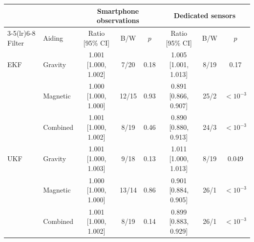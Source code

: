 \begin{tabular}{llccc@{\hspace{1.2em}}ccc}
\toprule
 & & \multicolumn{3}{c}{Smartphone observations} & \multicolumn{3}{c}{Dedicated sensors} \\
\cmidrule(lr){3-5}\cmidrule(lr){6-8}
Filter & Aiding & Ratio [95\% CI] & B/W & \(p\) & Ratio [95\% CI] & B/W & \(p\) \\
\midrule
EKF & Gravity & 1.001 [1.000, 1.002] & 7/20 & 0.18 & 1.005 [1.001, 1.013] & 8/19 & 0.17 \\
 & Magnetic & 1.000 [1.000, 1.000] & 12/15 & 0.93 & 0.891 [0.866, 0.907] & 25/2 & \(<10^{-3}\) \\
 & Combined & 1.001 [1.000, 1.002] & 8/19 & 0.46 & 0.890 [0.880, 0.913] & 24/3 & \(<10^{-3}\) \\
\midrule
UKF & Gravity & 1.001 [1.000, 1.003] & 9/18 & 0.13 & 1.011 [1.000, 1.013] & 8/19 & 0.049 \\
 & Magnetic & 1.000 [1.000, 1.000] & 13/14 & 0.86 & 0.901 [0.884, 0.905] & 26/1 & \(<10^{-3}\) \\
 & Combined & 1.001 [1.000, 1.002] & 8/19 & 0.14 & 0.899 [0.883, 0.929] & 26/1 & \(<10^{-3}\) \\
\bottomrule
\end{tabular}

